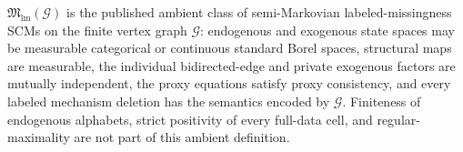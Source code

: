 \(\mathfrak M_{\mathrm{lm}}(\mathcal G)\) is the published ambient class of semi-Markovian labeled-missingness SCMs on the finite vertex graph \(\mathcal G\): endogenous and exogenous state spaces may be measurable categorical or continuous standard Borel spaces, structural maps are measurable, the individual bidirected-edge and private exogenous factors are mutually independent, the proxy equations satisfy proxy consistency, and every labeled mechanism deletion has the semantics encoded by \(\mathcal G\). Finiteness of endogenous alphabets, strict positivity of every full-data cell, and regular-maximality are not part of this ambient definition.